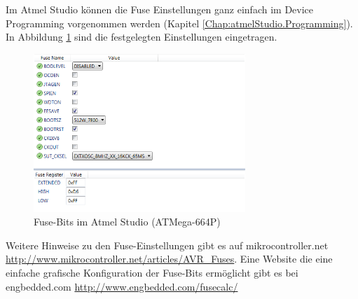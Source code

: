 Im Atmel Studio können die Fuse Einstellungen ganz einfach im Device Programming
vorgenommen werden (Kapitel \ref{Chap:atmelStudio.Programming}). In Abbildung
\ref{fuses-graf} sind die festgelegten Einstellungen eingetragen.

\begin{figure}[h]
\centering
\includegraphics[width=8cm]{content/pictures/Fusebits/fusebits_atmelstudio.png}
\caption{Fuse-Bits im Atmel Studio (ATMega-664P)}
\label{fuses-graf}
\end{figure}

Weitere Hinweise zu den Fuse-Einstellungen gibt es auf mikrocontroller.net
\url{http://www.mikrocontroller.net/articles/AVR_Fuses}.
Eine Website die eine einfache grafische Konfiguration der Fuse-Bits ermöglicht
gibt es bei engbedded.com \url{http://www.engbedded.com/fusecalc/}

